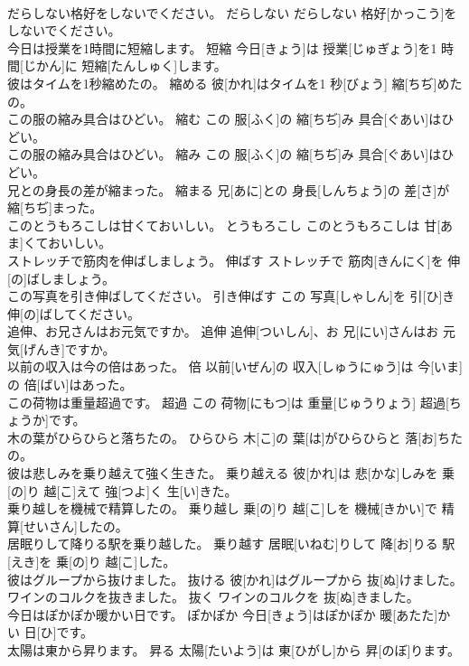 \documentclass[8pt]{extreport}
\begin{document}
\begin{CJK}{UTF8}{min}
\\	だらしない格好をしないでください。	だらしない	だらしない 格好[かっこう]をしないでください。	
\\	今日は授業を1時間に短縮します。	短縮	今日[きょう]は 授業[じゅぎょう]を1 時間[じかん]に 短縮[たんしゅく]します。	
\\	彼はタイムを1秒縮めたの。	縮める	彼[かれ]はタイムを1 秒[びょう] 縮[ちぢ]めたの。	
\\	この服の縮み具合はひどい。	縮む	この 服[ふく]の 縮[ちぢ]み 具合[ぐあい]はひどい。	
\\	この服の縮み具合はひどい。	縮み	この 服[ふく]の 縮[ちぢ]み 具合[ぐあい]はひどい。	
\\	兄との身長の差が縮まった。	縮まる	兄[あに]との 身長[しんちょう]の 差[さ]が 縮[ちぢ]まった。	
\\	このとうもろこしは甘くておいしい。	とうもろこし	このとうもろこしは 甘[あま]くておいしい。	
\\	ストレッチで筋肉を伸ばしましょう。	伸ばす	ストレッチで 筋肉[きんにく]を 伸[の]ばしましょう。	
\\	この写真を引き伸ばしてください。	引き伸ばす	この 写真[しゃしん]を 引[ひ]き 伸[の]ばしてください。	
\\	追伸、お兄さんはお元気ですか。	追伸	追伸[ついしん]、お 兄[にい]さんはお 元気[げんき]ですか。	
\\	以前の収入は今の倍はあった。	倍	以前[いぜん]の 収入[しゅうにゅう]は 今[いま]の 倍[ばい]はあった。	
\\	この荷物は重量超過です。	超過	この 荷物[にもつ]は 重量[じゅうりょう] 超過[ちょうか]です。	
\\	木の葉がひらひらと落ちたの。	ひらひら	木[こ]の 葉[は]がひらひらと 落[お]ちたの。	
\\	彼は悲しみを乗り越えて強く生きた。	乗り越える	彼[かれ]は 悲[かな]しみを 乗[の]り 越[こ]えて 強[つよ]く 生[い]きた。	
\\	乗り越しを機械で精算したの。	乗り越し	乗[の]り 越[こ]しを 機械[きかい]で 精算[せいさん]したの。	
\\	居眠りして降りる駅を乗り越した。	乗り越す	居眠[いねむ]りして 降[お]りる 駅[えき]を 乗[の]り 越[こ]した。	
\\	彼はグループから抜けました。	抜ける	彼[かれ]はグループから 抜[ぬ]けました。	
\\	ワインのコルクを抜きました。	抜く	ワインのコルクを 抜[ぬ]きました。	
\\	今日はぽかぽか暖かい日です。	ぽかぽか	今日[きょう]はぽかぽか 暖[あたた]かい 日[ひ]です。	
\\	太陽は東から昇ります。	昇る	太陽[たいよう]は 東[ひがし]から 昇[のぼ]ります。	

\end{CJK}
\end{document}
